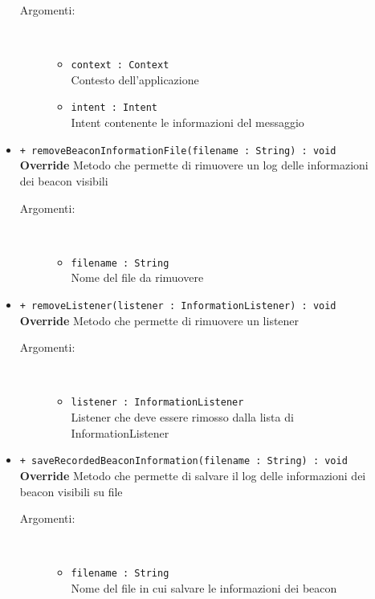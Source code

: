 \documentclass[../DefinizioneDiProdotto.tex]{subfiles}
\begin{document}
\begin{description}
\begin{itemize}
		\begin{description}
			\item[Argomenti:] \
			\begin{itemize}
				\item \texttt{context : Context}\\
				Contesto dell'applicazione\item \texttt{intent : Intent}\\
				Intent contenente le informazioni del messaggio\end{itemize}
		\end{description}
		\item \texttt{+ removeBeaconInformationFile(filename : String) : void}\\
		\textbf{Override} Metodo che permette di rimuovere un log delle informazioni dei beacon visibili
		\begin{description}
			\item[Argomenti:] \
			\begin{itemize}
				\item \texttt{filename : String}\\
				Nome del file da rimuovere\end{itemize}
		\end{description}
		\item \texttt{+ removeListener(listener : InformationListener) : void}\\
		\textbf{Override} Metodo che permette di rimuovere un listener
		\begin{description}
			\item[Argomenti:] \
			\begin{itemize}
				\item \texttt{listener : InformationListener}\\
				Listener che deve essere rimosso dalla lista di InformationListener\end{itemize}
		\end{description}
		\item \texttt{+ saveRecordedBeaconInformation(filename : String) : void}\\
		\textbf{Override} Metodo che permette di salvare il log delle informazioni dei beacon visibili su file
		\begin{description}
			\item[Argomenti:] \
			\begin{itemize}
				\item \texttt{filename : String}\\
				Nome del file in cui salvare le informazioni dei beacon\end{itemize}

\end{description}
\end{itemize}
\end{description}
\end{document}
